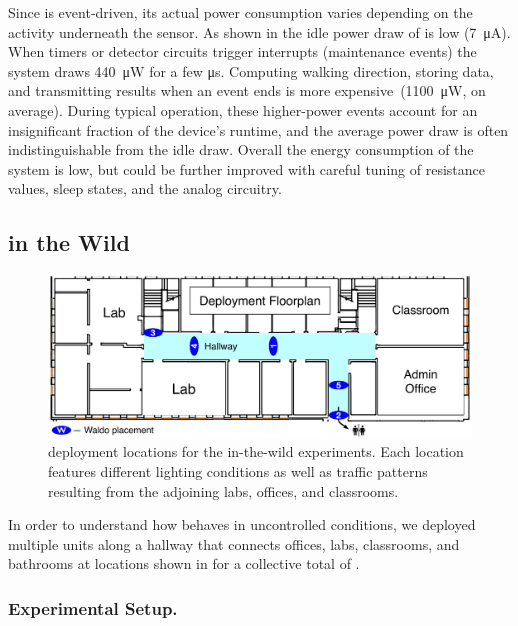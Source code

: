 Since \sysname is event-driven, its actual power consumption varies depending on the activity underneath the sensor. As shown in  the idle power draw of \sysname is low (\SI{7}{\micro\ampere}). When timers or detector circuits trigger interrupts (maintenance events) the system draws \SI{440}{\micro\watt} for a few \si{\micro\second}.
Computing walking direction, storing data, and transmitting results when an event ends is more expensive~(\SI{1100}{\micro\watt}, on average).
During typical operation, these higher-power events account for an insignificant fraction of the device's runtime, and the average power draw is often indistinguishable from the idle draw.
Overall the energy consumption of the system is low, but could be further improved with careful tuning of resistance values, sleep states, and the analog circuitry.







\subsection{\sysnames in the Wild}


\begin{figure}[t]
\centering
\includegraphics[width=0.8\columnwidth]{figs/floorplan.pdf}
\caption{\sysname deployment locations for the in-the-wild experiments. Each location features different lighting conditions as well as traffic patterns resulting from the adjoining labs, offices, and classrooms. \label{fig:floorplan}}
\end{figure}


In order to understand how \sysname behaves in uncontrolled conditions, we deployed multiple \sysname units along a hallway that connects offices, labs, classrooms, and bathrooms at locations shown in  for a collective total of \ITWdays.  


\subsubsection{Experimental Setup.}

